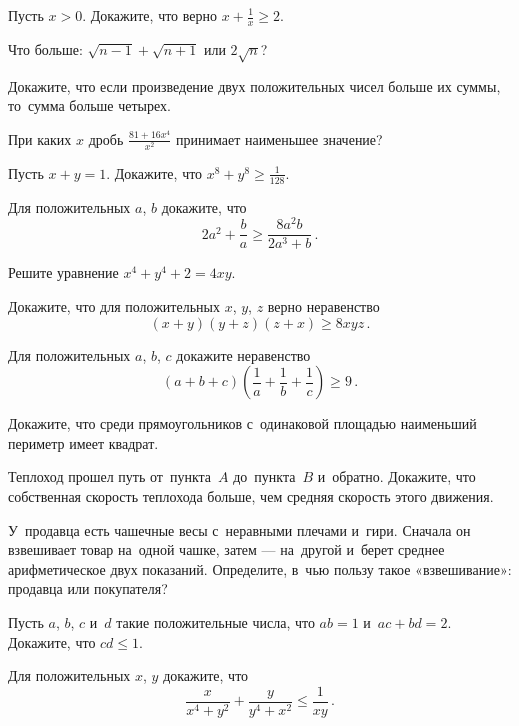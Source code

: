 


\begin{problems}

\item
Пусть $x > 0$.
Докажите, что верно $x + \frac{1}{x} \geq 2$.

\item
Что больше: $\sqrt{n - 1} + \sqrt{n + 1}$ или $2 \sqrt{n}$?

\item
Докажите, что если произведение двух положительных чисел больше их суммы,
то~сумма больше четырех.

\item
При каких $x$ дробь $\frac{81 + 16x^4}{x^2}$ принимает наименьшее значение?

\item
Пусть $x + y = 1$.
Докажите, что $x^8 + y^8 \geq \frac{1}{128}$.

\item
Для положительных $a$, $b$ докажите, что
\[
    2 a^2 + \frac{b}{a} \geq \frac{8 a^2 b}{2 a^3 + b}
\, . \]

\item
Решите уравнение $x^4 + y^4 + 2 = 4 x y$.

\item
Докажите, что для положительных $x$, $y$, $z$ верно неравенство
\[
    (x + y) (y + z) (z + x) \geq 8 x y z
\, . \]

\item
Для положительных $a$, $b$, $c$ докажите неравенство
\[
    (a + b + c)
    \left(
        \frac{1}{a} + \frac{1}{b} + \frac{1}{c}
    \right)
\geq
    9
\, . \]

\item
Докажите, что среди прямоугольников с~одинаковой площадью наименьший периметр
имеет квадрат.

\item
Теплоход прошел путь от~пункта~$A$ до~пункта~$B$ и~обратно.
Докажите, что собственная скорость теплохода больше, чем средняя скорость этого
движения.

\item
У~продавца есть чашечные весы с~неравными плечами и~гири.
Сначала он взвешивает товар на~одной чашке, затем — на~другой и~берет среднее
арифметическое двух показаний.
Определите, в~чью пользу такое «взвешивание»: продавца или покупателя?

\item
Пусть $a$, $b$, $c$ и~$d$ такие положительные числа, что $a b = 1$ и~$a c + b d = 2$.
Докажите, что $c d \leq 1$.

\item
Для положительных $x$, $y$ докажите, что
\[
    \frac{x}{x^4 + y^2} + \frac{y}{y^4 + x^2}
\leq
    \frac{1}{x y}
\, . \]


\end{problems}

